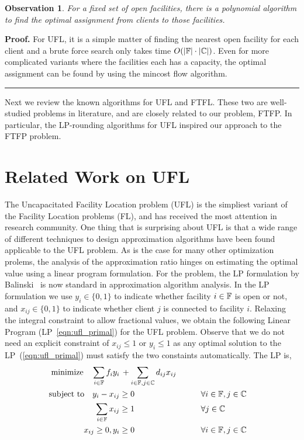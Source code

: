\documentclass[oneside,final]{ucr}
\newtheorem{observation}[theorem]{Observation}
\newenvironment{proof}[1][Proof]{\textbf{#1.} }{\ \rule{0.5em}{0.5em}}
\begin{document}
\begin{observation}
  For a fixed set of open facilities, there is a polynomial
  algorithm to find the optimal assignment from clients to
  those facilities.
\end{observation}
\begin{proof}
  For UFL, it is a simple matter of finding the nearest open
  facility for each client and a brute force search only
  takes time $O(|\mathbb{F}|\cdot |\mathbb{C}|)$. Even for
  more complicated variants where the facilities each has a
  capacity, the optimal assignment can be found by using the
  mincost flow algorithm.
\end{proof}

Next we review the known algorithms for UFL and FTFL. These
two are well-studied problems in literature, and are closely
related to our problem, FTFP. In particular, the LP-rounding
algorithms for UFL inspired our approach to the FTFP
problem.

\section{Related Work on UFL}
The Uncapacitated Facility Location problem (UFL) is the
simpliest variant of the Facility Location problems (FL),
and has received the most attention in research
community. One thing that is surprising about UFL is that a
wide range of different techniques to design approximation
algorithms have been found applicable to the UFL problem. As
is the case for many other optimization prolems, the
analysis of the approximation ratio hinges on estimating the
optimal value using a linear program formulation. For the
{\UFL} problem, the LP formulation by Balinski~\cite{Bal66}
is now standard in approximation algorithm analysis. In the
LP formulation we use $y_i\in \{0,1\}$ to indicate whether
facility $i\in\mathbb{F}$ is open or not, and $x_{ij} \in
\{0,1\}$ to indicate whether client $j$ is connected to
facility $i$. Relaxing the integral constraint to allow
fractional values, we obtain the following Linear Program
(LP~\ref{eqn:ufl_primal}) for the UFL problem. Observe that
we do not need an explicit constraint of $x_{ij} \leq 1$ or
$y_i \leq 1$ as any optimal solution to the
LP~(\ref{eqn:ufl_primal}) must satisfy the two constaints
automatically. The LP is,
\begin{alignat}{3}
  \textrm{minimize} \quad \sum_{i\in \mathbb{F}}f_iy_i &\,+
  \sum_{i\in \mathbb{F}, j\in \mathbb{C}} d_{ij}x_{ij}
  &\label{eqn:ufl_primal}
\\ \notag
\textrm{subject to} \quad y_i - x_{ij} &\geq 0 &\quad\quad & \forall i\in \mathbb{F}, j\in \mathbb{C} 
\\ \notag
\sum_{i\in \mathbb{F}} x_{ij} &\geq 1 & &\forall j\in \mathbb{C}
\\ \notag
x_{ij} \geq 0, y_i &\geq 0 & &\forall i\in \mathbb{F}, j\in \mathbb{C} 
\\ \notag
\end{alignat}
\end{document}
